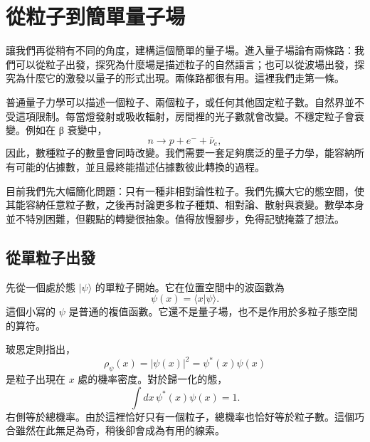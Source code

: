 \chapter{從粒子到簡單量子場}

讓我們再從稍有不同的角度，建構這個簡單的量子場。進入量子場論有兩條路：我們可以從粒子出發，探究為什麼場是描述粒子的自然語言；也可以從波場出發，探究為什麼它的激發以量子的形式出現。兩條路都很有用。這裡我們走第一條。

普通量子力學可以描述一個粒子、兩個粒子，或任何其他固定粒子數。自然界並不受這項限制。每當燈發射或吸收輻射，房間裡的光子數就會改變。不穩定粒子會衰變。例如在 {\proseunicodefont β} 衰變中，
\begin{equation}
n\longrightarrow p+e^-+\bar{\nu}_e,
\end{equation}
因此，數種粒子的數量會同時改變。我們需要一套足夠廣泛的量子力學，能容納所有可能的佔據數，並且最終能描述佔據數彼此轉換的過程。

目前我們先大幅簡化問題：只有一種非相對論性粒子。我們先擴大它的態空間，使其能容納任意粒子數，之後再討論更多粒子種類、相對論、散射與衰變。數學本身並不特別困難，但觀點的轉變很抽象。值得放慢腳步，免得記號掩蓋了想法。

\section{從單粒子出發}

先從一個處於態 \(|\psi\rangle\) 的單粒子開始。它在位置空間中的波函數為
\begin{equation}
\psi(x)=\langle x|\psi\rangle.
\label{eq:l07-wavefunction}
\end{equation}
這個小寫的 \(\psi\) 是普通的複值函數。它還不是量子場，也不是作用於多粒子態空間的算符。

玻恩定則指出，
\begin{equation}
\rho_\psi(x)=|\psi(x)|^2=\psi^*(x)\psi(x)
\label{eq:l07-born-density}
\end{equation}
是粒子出現在 \(x\) 處的機率密度。對於歸一化的態，
\begin{equation}
\int dx\,\psi^*(x)\psi(x)=1.
\label{eq:l07-one-particle-normalization}
\end{equation}
右側等於總機率。由於這裡恰好只有一個粒子，總機率也恰好等於粒子數。這個巧合雖然在此無足為奇，稍後卻會成為有用的線索。

\begin{classroomqa}
\end{classroomqa}

